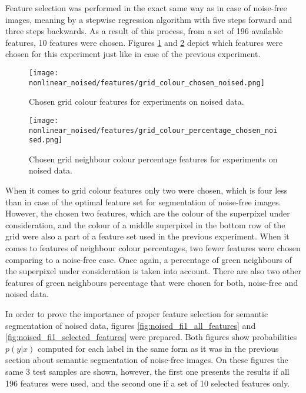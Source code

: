 Feature selection was performed in the exact same way as in case of noise-free images, meaning by a stepwise regression algorithm with five steps forward and three steps backwards. As a result of this process, from a set of 196 available features, 10 features were chosen. Figures \ref{fig:nonlinear_noised_features_colour} and \ref{fig:nonlinear_noised_features_percentage} depict which features were chosen for this experiment just like in case of the previous experiment. 
\begin{figure}[ht]
    \centering
    \texttt{[image: nonlinear\_noised/features/grid\_colour\_chosen\_noised.png]}
    \caption{Chosen grid colour features for experiments on noised data.}
    \label{fig:nonlinear_noised_features_colour}
\end{figure}
\begin{figure}[ht]
    \centering
    \texttt{[image: nonlinear\_noised/features/grid\_colour\_percentage\_chosen\_noised.png]}
    \caption{Chosen grid neighbour colour percentage features for experiments on noised data.}
    \label{fig:nonlinear_noised_features_percentage}
\end{figure}

When it comes to grid colour features only two were chosen, which is four less than in case of the optimal feature set for segmentation of noise-free images. However, the chosen two features, which are the colour of the superpixel under consideration, and the colour of a middle superpixel in the bottom row of the grid were also a part of a feature set used in the previous experiment. When it comes to features of neighbour colour percentages, two fewer features were chosen comparing to a noise-free case. Once again, a percentage of green neighbours of the superpixel under consideration is taken into account. There are also two other features of green neighbours percentage that were chosen for both, noise-free and noised data. 

In order to prove the importance of proper feature selection for semantic segmentation of noised data, figures \ref{fig:noised_fi1_all_features} and \ref{fig:noised_fi1_selected_features} were prepared. Both figures show probabilities $p(y|x)$ computed for each label in the same form as it was in the previous section about semantic segmentation of noise-free images. On these figures the same 3 test samples are shown, however, the first one presents the results if all 196 features were used, and the second one if a set of 10 selected features only. 

